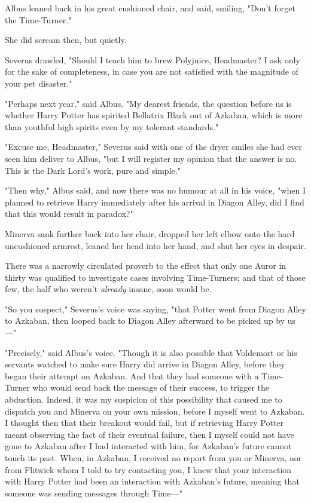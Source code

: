 Albus leaned back in his great cushioned chair, and said, smiling, "Don't
forget the Time-Turner."

She did scream then, but quietly.

Severus drawled, "Should I teach him to brew Polyjuice, Headmaster? I ask only
for the sake of completeness, in case you are not satisfied with the magnitude
of your pet disaster."

"Perhaps next year," said Albus. "My dearest friends, the question before us is
whether Harry Potter has spirited Bellatrix Black out of Azkaban, which is more
than youthful high spirits even by my tolerant standards."

"Excuse me, Headmaster," Severus said with one of the dryer smiles she had ever
seen him deliver to Albus, "but I will register my opinion that the answer is
no. This is the Dark Lord's work, pure and simple."

"Then why," Albus said, and now there was no humour at all in his voice, "when I
planned to retrieve Harry immediately after his arrival in Diagon Alley, did I
find that this would result in paradox?"

Minerva sank further back into her chair, dropped her left elbow onto the hard
uncushioned armrest, leaned her head into her hand, and shut her eyes in
despair.

There was a narrowly circulated proverb to the effect that only one Auror in
thirty was qualified to investigate cases involving Time-Turners; and that of
those few, the half who weren't \emph{already} insane, soon would be.

"So you suspect," Severus's voice was saying, "that Potter went from Diagon
Alley to Azkaban, then looped back to Diagon Alley afterward to be picked up by
us---"

"Precisely," said Albus's voice. "Though it is also possible that Voldemort or
his servants watched to make sure Harry did arrive in Diagon Alley, before they
began their attempt on Azkaban. And that they had someone with a Time-Turner
who would send back the message of their success, to trigger the abduction.
Indeed, it was my suspicion of this possibility that caused me to dispatch you
and Minerva on your own mission, before I myself went to Azkaban. I thought
then that their breakout would fail, but if retrieving Harry Potter meant
observing the fact of their eventual failure, then I myself could not have gone
to Azkaban after I had interacted with him, for Azkaban's future cannot touch
its past. When, in Azkaban, I received no report from you or Minerva, nor from
Flitwick whom I told to try contacting you, I knew that your interaction with
Harry Potter had been an interaction with Azkaban's future, meaning that
someone was sending messages through Time---"

